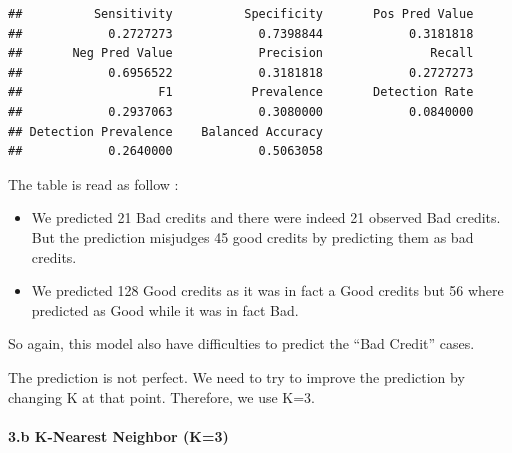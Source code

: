 \documentclass[
]{article}
\providecommand{\tightlist}{%
  \setlength{\itemsep}{0pt}\setlength{\parskip}{0pt}}
\begin{document}
\begin{verbatim}
##          Sensitivity          Specificity       Pos Pred Value 
##            0.2727273            0.7398844            0.3181818 
##       Neg Pred Value            Precision               Recall 
##            0.6956522            0.3181818            0.2727273 
##                   F1           Prevalence       Detection Rate 
##            0.2937063            0.3080000            0.0840000 
## Detection Prevalence    Balanced Accuracy 
##            0.2640000            0.5063058
\end{verbatim}

The table is read as follow :

\begin{itemize}
\tightlist
\item
  We predicted 21 Bad credits and there were indeed 21 observed Bad
  credits. But the prediction misjudges 45 good credits by predicting
  them as bad credits.
\item
  We predicted 128 Good credits as it was in fact a Good credits but 56
  where predicted as Good while it was in fact Bad.
\end{itemize}

So again, this model also have difficulties to predict the ``Bad
Credit'' cases.

The prediction is not perfect. We need to try to improve the prediction
by changing K at that point. Therefore, we use K=3.

\hypertarget{b-k-nearest-neighbor-k3}{%
\paragraph{3.b K-Nearest Neighbor (K=3)}\label{b-k-nearest-neighbor-k3}}
\end{document}
